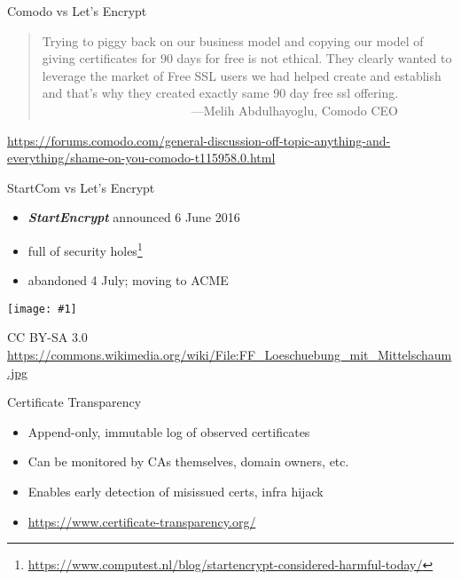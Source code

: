 \documentclass[ignorenonframetext,aspectratio=169]{beamer}
\makeatletter
\def\maxwidth{\ifdim\Gin@nat@width>\linewidth\linewidth\else\Gin@nat@width\fi}
\def\maxheight{\ifdim\Gin@nat@height>\textheight0.8\textheight\else\Gin@nat@height\fi}
\newcommand{\includegraphicsscaled}[1]{
    \texttt{[image: \#1]}
}
\makeatother
\begin{document}
\begin{frame}{Comodo vs Let's Encrypt}
\large
\begin{quote}
  Trying to piggy back on our business model and copying our model
  of giving certificates for 90 days for free is not ethical. They
  clearly wanted to leverage the market of Free SSL users we had
  helped create and establish and that's why they created exactly
  same 90 day free ssl offering.\\
  ~~~~~~~~~~~~~~~~~~~~~~~~---Melih Abdulhayoglu, Comodo CEO
\end{quote}

\bigskip

\tiny

\url{https://forums.comodo.com/general-discussion-off-topic-anything-and-everything/shame-on-you-comodo-t115958.0.html}

\end{frame}

\begin{frame}{StartCom vs Let's Encrypt}

\begin{itemize}
\item
  \textbf{\emph{StartEncrypt}} announced 6 June 2016
\item
  full of security holes\footnote{
    \url{https://www.computest.nl/blog/startencrypt-considered-harmful-today/}}
\item
  abandoned 4 July; moving to ACME
\end{itemize}

\end{frame}

\begin{frame}[plain]

\begin{center}
\includegraphicsscaled{FF_Loeschuebung_mit_Mittelschaum.jpg}
\end{center}

\tiny

CC BY-SA 3.0
\url{https://commons.wikimedia.org/wiki/File:FF_Loeschuebung_mit_Mittelschaum.jpg}

\end{frame}

\begin{frame}{Certificate Transparency}

\begin{itemize}
\item
  Append-only, immutable log of observed certificates
\item
  Can be monitored by CAs themselves, domain owners, etc.
\item
  Enables early detection of misissued certs, infra hijack
\item
  \url{https://www.certificate-transparency.org/}
\end{itemize}

\end{frame}
\end{document}
